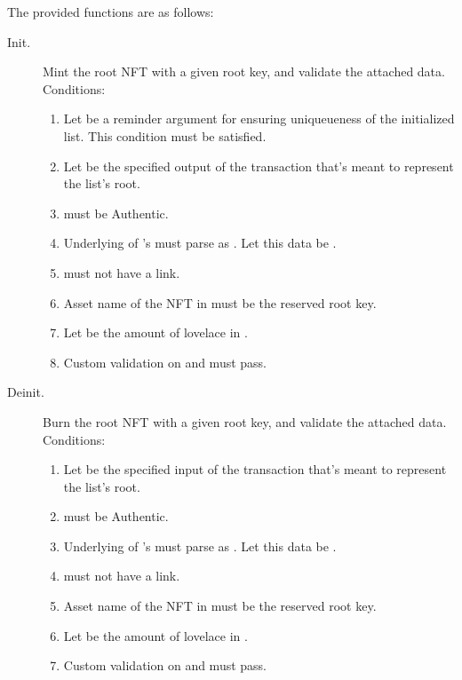 \documentclass[../midgard.tex]{subfiles}
\begin{document}
The provided functions are as follows:
\begin{description}
    \item[Init.] Mint the root NFT with a given root key, and validate the attached data.
      Conditions:
      \begin{enumerate}
        \item Let  be a reminder argument for ensuring uniqueueness of the initialized list.
          This condition must be satisfied.
        \item Let  be the specified output of the transaction that's meant to represent the list's root.
        \item {} must be Authentic.
        \item Underlying  of 's  must parse as .
          Let this data be .
        \item {} must not have a link.
        \item Asset name of the NFT in  must be the reserved root key.
        \item Let  be the amount of lovelace in .
        \item Custom validation on  and  must pass.
      \end{enumerate}

    \item[Deinit.] Burn the root NFT with a given root key, and validate the attached data.
      Conditions:
      \begin{enumerate}
        \item Let  be the specified input of the transaction that's meant to represent the list's root.
        \item {} must be Authentic.
        \item Underlying  of 's  must parse as .
          Let this data be .
        \item {} must not have a link.
        \item Asset name of the NFT in  must be the reserved root key.
        \item Let  be the amount of lovelace in .
        \item Custom validation on  and  must pass.
      \end{enumerate}
    

\end{description}
\end{document}
